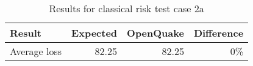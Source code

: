 \begin{table}[htbp]

\centering
\begin{tabular}{ l r r r }

\hline
\rowcolor{anti-flashwhite}
\bf{Result} & \bf{Expected} & \bf{OpenQuake} & \bf{Difference}\\
\hline
Average loss & 82.25 & 82.25 & 0\% \\
\hline
\end{tabular}

\caption{Results for classical risk test case 2a}
\label{tab:result-classical-risk-2a}
\end{table}